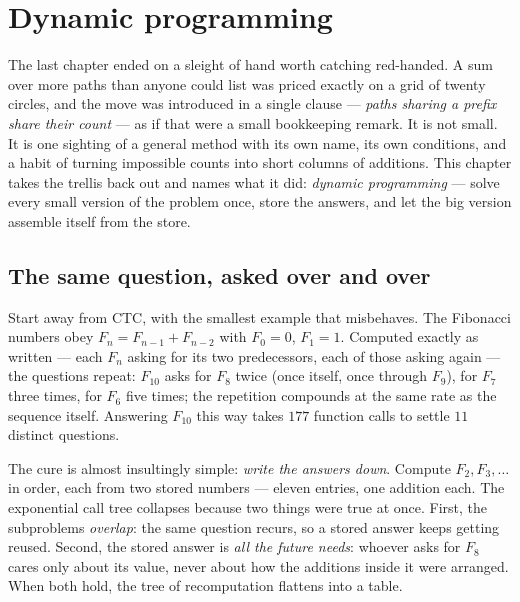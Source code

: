 \chapter{Dynamic programming}

\begin{narrative}
The last chapter ended on a sleight of hand worth catching red-handed. A
sum over more paths than anyone could list was priced exactly on a grid
of twenty circles, and the move was introduced in a single clause —
\emph{paths sharing a prefix share their count} — as if that were a
small bookkeeping remark. It is not small. It is one sighting of a
general method with its own name, its own conditions, and a habit of
turning impossible counts into short columns of additions. This chapter
takes the trellis back out and names what it did: \emph{dynamic
programming} — solve every small version of the problem once, store the
answers, and let the big version assemble itself from the store.

\section{The same question, asked over and over}

Start away from CTC, with the smallest example that misbehaves. The
Fibonacci numbers obey $F_n = F_{n-1} + F_{n-2}$ with $F_0 = 0$,
$F_1 = 1$. Computed exactly as written — each $F_n$ asking for its two
predecessors, each of those asking again — the questions repeat:
$F_{10}$ asks for $F_8$ twice (once itself, once through $F_9$), for
$F_7$ three times, for $F_6$ five times; the repetition compounds at
the same rate as the sequence itself. Answering $F_{10}$ this way takes
$177$ function calls to settle $11$ distinct questions.

The cure is almost insultingly simple: \emph{write the answers down}.
Compute $F_2, F_3, \dots$ in order, each from two stored numbers —
eleven entries, one addition each. The exponential call tree collapses
because two things were true at once. First, the subproblems
\emph{overlap}: the same question recurs, so a stored answer keeps
getting reused. Second, the stored answer is \emph{all the future
needs}: whoever asks for $F_8$ cares only about its value, never about
how the additions inside it were arranged. When both hold, the tree of
recomputation flattens into a table.


\end{narrative}
